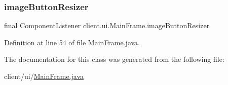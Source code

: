 \subsubsection{\texorpdfstring{image\+Button\+Resizer}{imageButtonResizer}}
{\footnotesize\ttfamily final Component\+Listener client.\+ui.\+Main\+Frame.\+image\+Button\+Resizer}



Definition at line 54 of file Main\+Frame.\+java.



The documentation for this class was generated from the following file\+:\begin{DoxyCompactItemize}
\item 
client/ui/\hyperlink{_main_frame_8java}{Main\+Frame.\+java}\end{DoxyCompactItemize}
